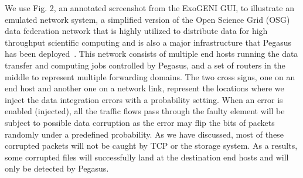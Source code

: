 We use Fig. 2, an annotated screenshot from the ExoGENI GUI, to illustrate an emulated network system, a simplified version of the Open Science Grid (OSG) data federation network that is highly utilized to distribute data for high throughput scientific computing and is also a major infrastructure that Pegasus has been deployed~\cite{OSG:web}. This network consists of multiple end hosts running the data transfer and computing jobs controlled by Pegasus, and a set of routers in the middle to represent multiple forwarding domains. The two cross signs, one on an 
end host and another one on a network link, represent the locations where we inject the data integration errors with a probability setting. When an error is enabled (injected), all the traffic flows pass through the faulty element will be subject to possible data corruption as the error may flip the bits of packets randomly under a predefined probability. As we have discussed, most of these corrupted packets will not be caught by TCP or the storage system. As a results, some corrupted files will successfully land at the destination end hosts and will only be detected by Pegasus.

